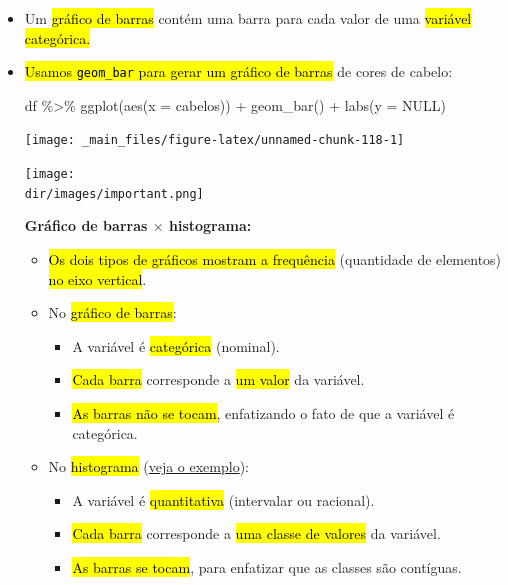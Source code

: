 \documentclass[
  11pt]{report}
\newenvironment{Shaded}{\begin{snugshade}}{\end{snugshade}}
\newcommand{\AttributeTok}[1]{\textcolor[rgb]{0.77,0.63,0.00}{#1}}
\newcommand{\ConstantTok}[1]{\textcolor[rgb]{0.00,0.00,0.00}{#1}}
\newcommand{\FunctionTok}[1]{\textcolor[rgb]{0.00,0.00,0.00}{#1}}
\newcommand{\NormalTok}[1]{#1}
\newcommand{\SpecialCharTok}[1]{\textcolor[rgb]{0.00,0.00,0.00}{#1}}
\newcommand{\dir}{/ssd/R/x86_64-pc-linux-gnu-library/4.1/fnaufelRmd/rmarkdown/resources}
\newenvironment{rmdimportant}
{
  \begin{myimportant}
    \texttt{[image: \\dir/images/important.png]}
    \tcblower
  }
  {
  \end{myimportant}
}
\renewenvironment{Shaded}{
    \begin{mdframed}[%
      roundcorner=2pt,%
      innerleftmargin=5pt,%
      innerrightmargin=5pt,%
      topline=true,%
      leftline=true,%
      rightline=true,%
      bottomline=true,%
      linewidth=0.5pt,%
      linecolor=black!20,%
      backgroundcolor=black!2,%
      skipabove=2ex,%
      skipbelow=2.5ex%
    ]%
  }
  {
    \end{mdframed}
  }
\begin{document}
\begin{itemize}
\item
  Um {\hl{gráfico de barras}} contém uma barra para cada valor de uma {\hl{variável categórica.}}
\item
  {\hl{Usamos {\mbox{\texttt{geom\_bar}}} para gerar um gráfico de barras}} de cores de cabelo:

\begin{Shaded}
\begin{Highlighting}[]
\NormalTok{df }\SpecialCharTok{\%\textgreater{}\%} 
  \FunctionTok{ggplot}\NormalTok{(}\FunctionTok{aes}\NormalTok{(}\AttributeTok{x =}\NormalTok{ cabelos)) }\SpecialCharTok{+}
    \FunctionTok{geom\_bar}\NormalTok{() }\SpecialCharTok{+}
    \FunctionTok{labs}\NormalTok{(}\AttributeTok{y =} \ConstantTok{NULL}\NormalTok{)}
\end{Highlighting}
\end{Shaded}

  \begin{center}\texttt{[image: \_main\_files/figure-latex/unnamed-chunk-118-1]} \end{center}

  \begin{rmdimportant}

  \textbf{Gráfico de barras $\times$ histograma:}

  \begin{itemize}
  \item
    {\hl{Os dois tipos de gráficos mostram a frequência}} (quantidade de elementos) {\hl{no eixo vertical}}.
  \item
    No {\hl{gráfico de barras}}:

    \begin{itemize}
    \item
      A variável é {\hl{categórica}} (nominal).
    \item
      {\hl{Cada barra}} corresponde a {\hl{um valor}} da variável.
    \item
      {\hl{As barras não se tocam}}, enfatizando o fato de que a variável é categórica.
    \end{itemize}
  \item
    No {\hl{histograma}} (\protect\hyperlink{histograma1}{veja o exemplo}):

    \begin{itemize}
    \item
      A variável é {\hl{quantitativa}} (intervalar ou racional).
    \item
      {\hl{Cada barra}} corresponde a {\hl{uma classe de valores}} da variável.
    \item
      {\hl{As barras se tocam}}, para enfatizar que as classes são contíguas.
    \end{itemize}
  \end{itemize}


\end{rmdimportant}
\end{itemize}
\end{document}
